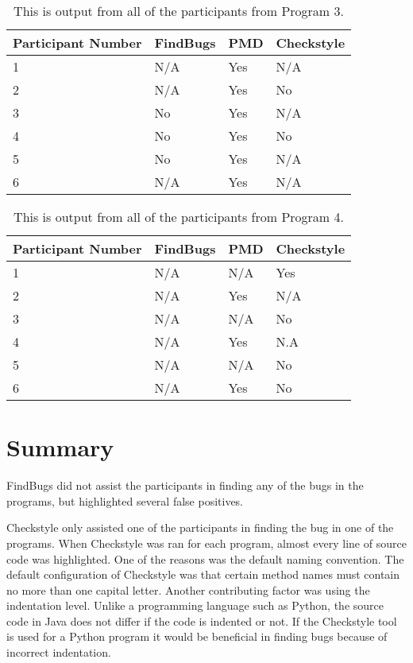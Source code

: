 \begin{table}
\begin{center}
	\begin{tabular}{| l | l | l | l |}
		\hline
		Participant Number & FindBugs & PMD & Checkstyle \\ \hline
		1 & N/A & Yes & N/A \\ \hline
		2 & N/A & Yes & No \\ \hline
		3 & No & Yes & N/A \\ \hline
		4 & No & Yes & No \\ \hline
		5 & No & Yes & N/A  \\ \hline
		6 & N/A & Yes & N/A \\ \hline
	\end{tabular}
	\caption{This is output from all of the participants from Program 3.}
\end{center}
\end{table}


\begin{table}
\begin{center}
	\begin{tabular}{| l | l | l | l |}
		\hline
		Participant Number & FindBugs & PMD & Checkstyle \\ \hline
		1 & N/A & N/A & Yes \\ \hline
		2 & N/A & Yes & N/A \\ \hline
		3 & N/A & N/A & No \\ \hline
		4 & N/A & Yes & N.A \\ \hline
		5 & N/A & N/A & No \\ \hline
		6 & N/A & Yes & No \\ \hline
	\end{tabular}
	\caption{This is output from all of the participants from Program 4.}
\end{center}
\end{table}

\newpage
\section{Summary}

FindBugs did not assist the participants in finding any of the bugs in the programs, but highlighted several false positives.

Checkstyle only assisted one of the participants in finding the bug in one of the programs. When Checkstyle was ran for each program, almost every line of source code was highlighted. One of the reasons was the default naming convention. The default configuration of Checkstyle was that certain method names must contain no more than one capital letter. Another contributing factor was using the indentation level. Unlike a programming language such as Python, the source code in Java does not differ if the code is indented or not. If the Checkstyle tool is used for a Python program it would be beneficial in finding bugs because of incorrect indentation.  

